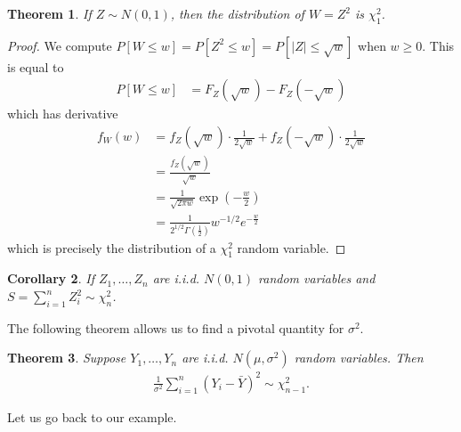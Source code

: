 \documentclass[11pt]{amsart}
\newtheorem{theorem}{Theorem}[section]
\newtheorem{corollary}[theorem]{Corollary}
\theoremstyle{definition}
\numberwithin{equation}{section}
\begin{document}
\begin{theorem}
    If $Z\sim N(0,1)$, then the distribution of $W=Z^2$ is $\chi_1^2$.
\end{theorem}
\begin{proof}
    We compute $P[W\le w]=P[Z^2\le w]=P[|Z|\le \sqrt{w}]$ when $w\ge 0$. This is equal to
    \begin{align*}
        P[W\le w]&=F_Z(\sqrt{w})-F_Z(-\sqrt{w})
    \end{align*}
    which has derivative
    \begin{align*}
        f_W(w)&=f_Z(\sqrt{w})\cdot\frac{1}{2\sqrt{w}}+f_Z(-\sqrt{w})\cdot\frac{1}{2\sqrt{w}}\\
        &=\frac{f_Z(\sqrt{w})}{\sqrt{w}}\\
        &=\frac{1}{\sqrt{2\pi w}}\exp(-\frac{w}{2})\\
        &=\frac{1}{2^{1/2}\Gamma(\frac{1}{2})}w^{-1/2}e^{-\frac{w}{2}}
    \end{align*}
    which is precisely the distribution of a $\chi_1^2$ random variable.
\end{proof}
\begin{corollary}
    If $Z_1,\ldots,Z_n$ are i.i.d. $N(0,1)$ random variables and $S=\sum_{i=1}^nZ_i^2\sim \chi^2_{n}$.
\end{corollary}
The following theorem allows us to find a pivotal quantity for $\sigma^2$.
\begin{theorem}
    Suppose $Y_1,\ldots,Y_n$ are i.i.d. $N(\mu,\sigma^2)$ random variables. Then
    \begin{align*}
        \frac{1}{\sigma^2}\sum_{i=1}^n(Y_i-\bar Y)^2\sim \chi_{n-1}^2.
    \end{align*}
\end{theorem}
Let us go back to our example. 
\setcounter{theorem}{35}
\end{document}

